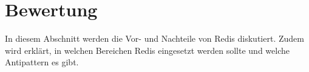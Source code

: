 
\section{Bewertung}

In diesem Abschnitt werden die Vor- und Nachteile von \ac{Redis} diskutiert. Zudem wird erklärt, in welchen Bereichen \ac{Redis} eingesetzt werden sollte und welche Antipattern es gibt.